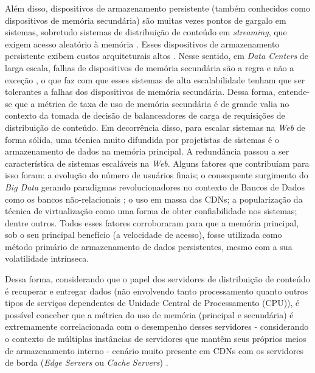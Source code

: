 Além disso, dispositivos de armazenamento persistente (também conhecidos como dispositivos de memória secundária) são muitas vezes pontos de gargalo em sistemas, sobretudo sistemas de distribuição de conteúdo em \textit{streaming}, que exigem acesso aleatório à memória \cite{sivathanu2013IOWorkloads}. Esses dispositivos de armazenamento persistente exibem custos arquiteturais altos \cite{arpaciDusseau98}. Nesse sentido, em \textit{Data Centers} de larga escala, falhas de dispositivos de memória secundária são a regra e não a exceção \cite{wuEtalIOWorkload}, o que faz com que esses sistemas de alta escalabilidade tenham que ser tolerantes a falhas dos dispositivos de memória secundária. Dessa forma, entende-se que a métrica de taxa de uso de memória secundária é de grande valia no contexto da tomada de decisão de balanceadores de carga de requisições de distribuição de conteúdo. Em decorrência disso, para escalar sistemas na \textit{Web} de forma sólida, uma técnica muito difundida por projetistas de sistemas é o armazenamento de dados na memória principal. A redundância passou a ser característica de sistemas escaláveis na \textit{Web}. Alguns fatores que contribuíam para isso foram: a evolução do número de usuários finais; o consequente surgimento do \textit{Big Data} gerando paradigmas revolucionadores no contexto de Bancos de Dados como os bancos não-relacionais \cite{riseofnewSQL}; o uso em massa das CDNs; a popularização da técnica de virtualização como uma forma de obter confiabilidade nos sistemas; dentre outros. Todos esses fatores corroboraram para que a memória principal, sob o seu principal benefício (a velocidade de acesso), fosse utilizada como método primário de armazenamento de dados persistentes, mesmo com a sua volatilidade intrínseca.

Dessa forma, considerando que o papel dos servidores de distribuição de conteúdo é recuperar e entregar dados (não envolvendo tanto processamento quanto outros tipos de serviços dependentes de Unidade Central de Processamento (CPU)), é possível conceber que a métrica do uso de memória (principal e secundária) é extremamente correlacionada com o desempenho desses servidores - considerando o contexto de múltiplas instâncias de servidores que mantêm seus próprios meios de armazenamento interno - cenário muito presente em CDNs com os servidores de borda (\textit{Edge Servers} ou \textit{Cache Servers}) \cite{surveyCDNArchitectures2025}.


